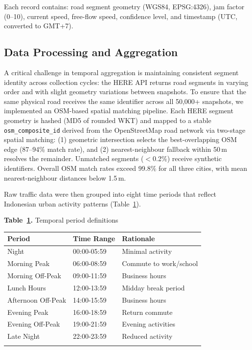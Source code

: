 \documentclass[12pt,a4paper]{article}
\begin{document}
Each record contains: road segment geometry (WGS84, EPSG:4326), jam factor (0--10), current speed, free-flow speed, confidence level, and timestamp (UTC, converted to GMT+7).

\subsection{Data Processing and Aggregation}

A critical challenge in temporal aggregation is maintaining consistent segment identity across collection cycles: the HERE API returns road segments in varying order and with slight geometry variations between snapshots. To ensure that the same physical road receives the same identifier across all 50,000+ snapshots, we implemented an OSM-based spatial matching pipeline. Each HERE segment geometry is hashed (MD5 of rounded WKT) and mapped to a stable \texttt{osm\_composite\_id} derived from the OpenStreetMap road network via two-stage spatial matching: (1) geometric intersection selects the best-overlapping OSM edge (87--94\% match rate), and (2) nearest-neighbour fallback within 50\,m resolves the remainder. Unmatched segments ($<$0.2\%) receive synthetic identifiers. Overall OSM match rates exceed 99.8\% for all three cities, with mean nearest-neighbour distances below 1.5\,m.

Raw traffic data were then grouped into eight time periods that reflect Indonesian urban activity patterns (Table~\ref{tab:table3_temporal}).

\textbf{Table~\ref{tab:table3_temporal}.} Temporal period definitions

\begin{longtable}[]{@{}lll@{}}
\toprule\noalign{}
Period & Time Range & Rationale \\
\midrule\noalign{}
\endhead
\bottomrule\noalign{}
\endlastfoot
Night & 00:00-05:59 & Minimal activity \\
Morning Peak & 06:00-08:59 & Commute to work/school \\
Morning Off-Peak & 09:00-11:59 & Business hours \\
Lunch Hours & 12:00-13:59 & Midday break period \\
Afternoon Off-Peak & 14:00-15:59 & Business hours \\
Evening Peak & 16:00-18:59 & Return commute \\
Evening Off-Peak & 19:00-21:59 & Evening activities \\
Late Night & 22:00-23:59 & Reduced activity \\
\label{tab:table3_temporal}
\end{longtable}
\end{document}
